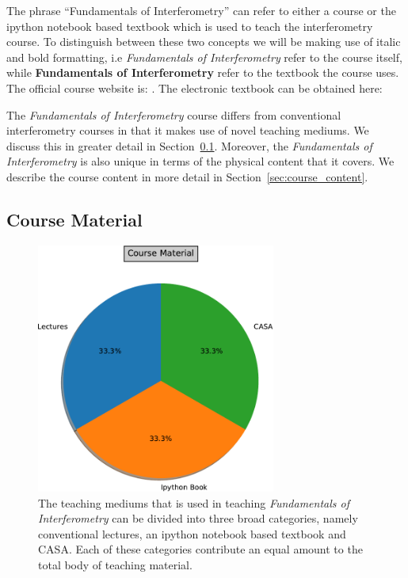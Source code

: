 \documentclass[prb,preprint]{revtex4-1}
\begin{document}
The phrase ``Fundamentals of Interferometry'' can refer to either a course or the ipython notebook based textbook which is used to teach the interferometry course. To distinguish between
these two concepts we will be making use of italic and bold formatting, i.e \textit{Fundamentals of Interferometry} refer to the course itself, while  
\textbf{Fundamentals of Interferometry} refer to the textbook the course uses. The official course website is: . The electronic textbook can be obtained here:

The \textit{Fundamentals of Interferometry} course differs from conventional interferometry courses in that it makes use of novel teaching mediums. We discuss this 
in greater detail in Section~\ref{sec:course_material}. Moreover, the \textit{Fundamentals of Interferometry} is also unique in terms of the physical content that it covers.
We describe the course content in more detail in Section~\ref{sec:course_content}.

\subsection{Course Material}
\label{sec:course_material}
\begin{figure}[h!]
\centering
\includegraphics[width=0.7\textwidth]{./course_material.pdf}
\caption{The teaching mediums that is used in teaching \textit{Fundamentals of Interferometry} can be divided into three broad categories, namely conventional 
lectures, an ipython notebook based textbook and CASA. Each of these categories contribute an equal amount to the total body of teaching material.}
\label{gasbulbdata}
\end{figure}
\end{document}
